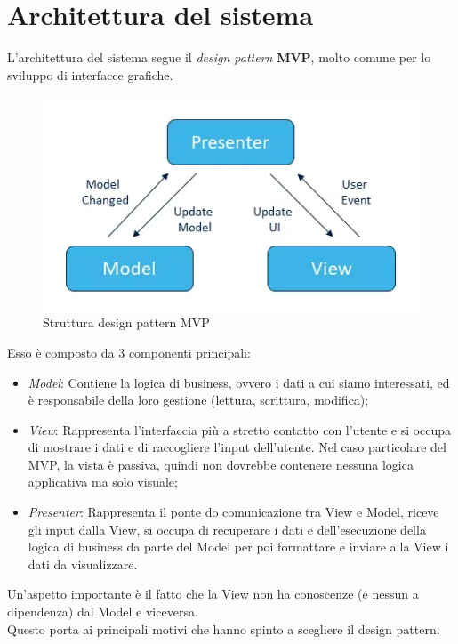 \section{Architettura del sistema}
L'architettura del sistema segue il \textit{design pattern} \textbf{MVP}, molto comune per lo sviluppo di interfacce grafiche. 


\begin{figure}[H] 
    \centering 
    \includegraphics[width=0.9\columnwidth]{immagini/mvp.png} 
    \caption{Struttura design pattern MVP \cite{site:mvp}}
    \label{fig:mvp}
\end{figure}

Esso è composto da 3 componenti principali:

\begin{itemize}

\item \textit{Model}: Contiene la logica di business, ovvero i dati a cui siamo interessati, ed è responsabile della loro gestione (lettura, scrittura, modifica);

\item \textit{View}: Rappresenta l'interfaccia più a stretto contatto con l'utente e si occupa di mostrare i dati e di raccogliere l'input dell'utente. Nel caso particolare del MVP, la vista è passiva, quindi non dovrebbe contenere nessuna logica applicativa ma solo visuale;

\item \textit{Presenter}: Rappresenta il ponte do comunicazione tra View e Model, riceve gli input dalla View, si occupa di recuperare i dati e dell'esecuzione della logica di business da parte del Model per poi formattare e inviare alla View i dati da visualizzare.

\end{itemize}

Un'aspetto importante è il fatto che la View non ha conoscenze (e nessun a dipendenza) dal Model e viceversa. 
\\
Questo porta ai principali motivi che hanno spinto a scegliere il design pattern:

